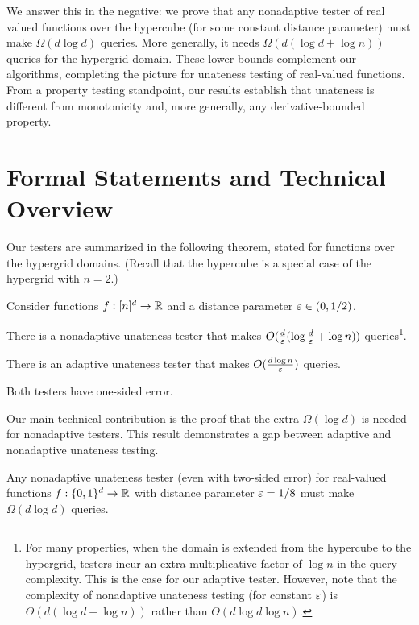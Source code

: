 We answer this in the negative: we prove that any nonadaptive tester of real valued functions over the hypercube (for some constant distance parameter) must make $\Omega(d\log d)$ queries.
More generally, it needs $\Omega(d(\log d+\log n))$ queries for the hypergrid domain. These lower bounds complement our algorithms, completing the picture for unateness testing of real-valued functions.
From a property testing standpoint, our results establish that unateness is different from
monotonicity and, more generally, any derivative-bounded
property.

\section{Formal Statements and Technical Overview}
Our testers are summarized in the following theorem, stated for functions over the hypergrid domains. (Recall that the hypercube is a special case of the hypergrid with $n=2$.)

\begin{theorem}\label{thm:main-hg}
	Consider functions $f:[n]^d \to {\mathbb R}$ and a distance parameter $\varepsilon\in (0,1/2)$.
	\begin{compactenum}
		\item\label{item:nonadaptive} There is a nonadaptive unateness tester that makes $O(\frac d {\varepsilon}(\log\frac d{\varepsilon} + \log n))$ queries\footnote{\scriptsize For many properties, when the domain is extended from the hypercube to the hypergrid, testers incur an extra multiplicative factor of $\log n$ in the query complexity. This is the case for our adaptive tester.
			 However, note that the complexity of nonadaptive unateness testing (for constant $\varepsilon$) is $\Theta(d(\log d + \log n))$ rather than $\Theta(d\log d\log n).$}.
		
		\item\label{item:adaptive} There is an adaptive unateness tester  that makes $O(\frac{d\log n}{\varepsilon})$ queries.
	\end{compactenum}
	Both testers have one-sided error.
\end{theorem}

\noindent
Our main technical contribution is the proof that the extra $\Omega(\log d)$ is needed for nonadaptive testers.
This result demonstrates a gap between adaptive and nonadaptive unateness testing.
\begin{theorem}\label{thm:non-adap-lb-1}
	Any nonadaptive unateness tester (even with two-sided error) for real-valued functions $f:\{0,1\}^d \to {\mathbb R}$ with distance parameter $\varepsilon = 1/8$  must make $\Omega(d\log d)$ queries.
\end{theorem}

